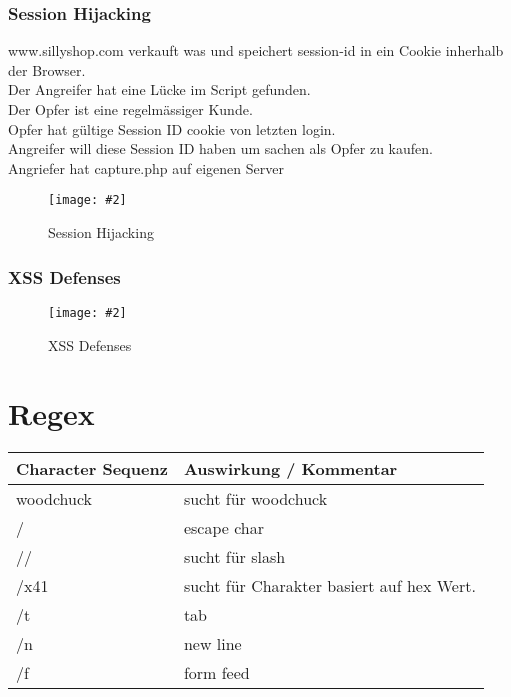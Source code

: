 \documentclass[a4paper,10pt]{scrreprt}
\newcommand{\pic}[2][figure]{\begin{figure}[h]
 \centering
 \texttt{[image: \#2]}
 \caption{#1}
\end{figure}
}
\begin{document}
\subsubsection{Session Hijacking}
www.sillyshop.com verkauft was und speichert session-id in ein Cookie inherhalb der Browser.\\
Der Angreifer hat eine Lücke im Script gefunden.\\
Der Opfer ist eine regelmässiger Kunde.\\
Opfer hat gültige Session ID cookie von letzten login.\\
Angreifer will diese Session ID haben um sachen als Opfer zu kaufen.\\
Angriefer hat capture.php auf eigenen Server\\

\pic[Session Hijacking]{session_hijack.png}

\subsubsection{XSS Defenses}
\pic[XSS Defenses]{xss_def.png}
  

\section{Regex}

\begin{tabular}{|l|l|}
 \hline 
 \textbf{Character Sequenz} & \textbf{Auswirkung / Kommentar} \\ \hline
 woodchuck & sucht für woodchuck \\ \hline
 \slash & escape char \\ \hline
 \slash\slash & sucht für slash \\ \hline
 \slash x41 & sucht für Charakter basiert auf hex Wert. \\ \hline
 \slash t & tab \\ \hline
 \slash n & new line \\ \hline
 \slash f & form feed \\ \hline
 
\end{tabular}
\end{document}
